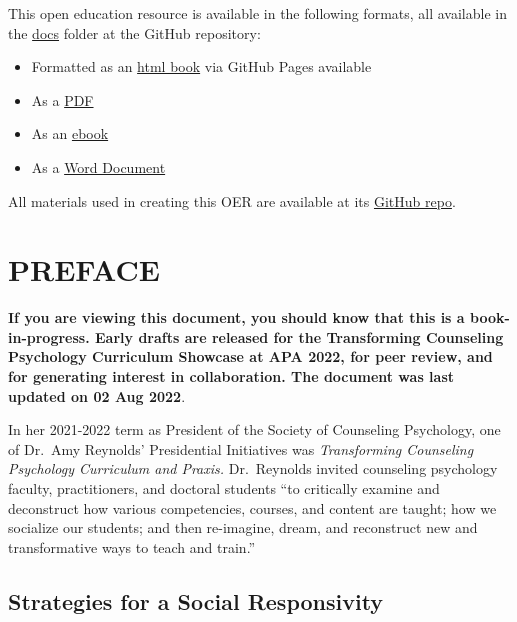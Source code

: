 \documentclass[
  11pt,
]{book}
\providecommand{\tightlist}{%
  \setlength{\itemsep}{0pt}\setlength{\parskip}{0pt}}
\begin{document}
This open education resource is available in the following formats, all available in the \href{https://github.com/lhbikos/TransformingResearchMethods/tree/main/docs}{docs} folder at the GitHub repository:

\begin{itemize}
\tightlist
\item
  Formatted as an \href{https://lhbikos.github.io/TransformingResearchMethods/}{html book} via GitHub Pages available
\item
  As a \href{https://github.com/lhbikos/TransformingResearchMethods/blob/main/docs/TransformingResearchMethods.pdf}{PDF}
\item
  As an \href{https://github.com/lhbikos/TransformingResearchMethods/blob/main/docs/TransformingResearchMethods.epub}{ebook}
\item
  As a \href{https://github.com/lhbikos/TransformingResearchMethods/blob/main/docs/TransformingResearchMethods.docx}{Word Document}
\end{itemize}

All materials used in creating this OER are available at its \href{https://github.com/lhbikos/TransformingResearchMethods}{GitHub repo}.

\hypertarget{preface}{%
\chapter*{PREFACE}\label{preface}}

\textbf{If you are viewing this document, you should know that this is a book-in-progress. Early drafts are released for the Transforming Counseling Psychology Curriculum Showcase at APA 2022, for peer review, and for generating interest in collaboration. The document was last updated on 02 Aug 2022}.

In her 2021-2022 term as President of the Society of Counseling Psychology, one of Dr.~Amy Reynolds' Presidential Initiatives was \emph{Transforming Counseling Psychology Curriculum and Praxis.} Dr.~Reynolds invited counseling psychology faculty, practitioners, and doctoral students ``to critically examine and deconstruct how various competencies, courses, and content are taught; how we socialize our students; and then re-imagine, dream, and reconstruct new and transformative ways to teach and train.''

\hypertarget{strategies-for-a-social-responsivity}{%
\section*{Strategies for a Social Responsivity}\label{strategies-for-a-social-responsivity}}
\end{document}
